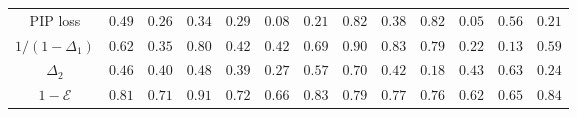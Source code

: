 \begin{table}
\begin{tabular}{c | c | c | c | c | c | c | c | c | c | c | c | c}
		PIP loss &  $0.49$&$0.26$&$0.34$  &  $0.29$&$0.08$&$0.21$  &  $0.82$&$0.38$&$0.82$  &  $0.05$&$0.56$&$0.21$  \\  
		$1/(1-\Delta_1)$ &  $0.62$&$0.35$&$0.80$  &  $0.42$&$0.42$&$0.69$  &  $0.90$&$0.83$&$0.79$  &  $0.22$&$0.13$&$0.59$  \\  
		$\Delta_2$ &  $0.46$&$0.40$&$0.48$  &  $0.39$&$0.27$&$0.57$  &  $0.70$&$0.42$&$0.18$  &  $0.43$&$0.63$&$0.24$  \\  
		$1 - \mathcal{E}$ & $\mathbf{0.81}$&$\mathbf{0.71}$&$\mathbf{0.91}$  &  $\mathbf{0.72}$&$\mathbf{0.66}$&$\mathbf{0.83}$  &  $0.79$&$0.77$&$0.76$  &  $\mathbf{0.62}$&$\mathbf{0.65}$&$\mathbf{0.84}$  \\  
		\bottomrule
	\end{tabular}
	\label{tab:sp_rank}
\end{table}


